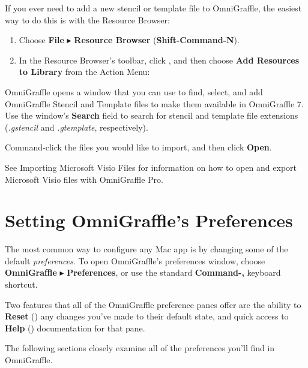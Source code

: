 \documentclass[../main.tex]{subfiles}
\begin{document}
If you ever need to add a new stencil or template file to OmniGraffle, the easiest way to do
this is with the Resource Browser:

\begin{enumerate}
  \item Choose \textbf{File} $\blacktriangleright$ \textbf{Resource Browser}
    (\textbf{Shift-Command-N}).
  \item In the Resource Browser's toolbar, click
    , and then choose \textbf{Add Resources to
    Library} from the Action Menu:
\end{enumerate}


OmniGraffle opens a window that you can use to find, select, and add OmniGraffle Stencil and
Template files to make them available in OmniGraffle 7. Use the window's \textbf{Search} field
to search for stencil and template file extensions (\textit{.gstencil} and
\textit{.gtemplate}, respectively).


Command-click the files you would like to import, and then click \textbf{Open}.

\begin{ognote}
  See Importing Microsoft Visio Files for information on how to open and export Microsoft Visio
  files with OmniGraffle Pro.
\end{ognote}

\section{Setting OmniGraffle's Preferences}

The most common way to configure any Mac app is by changing some of the default
\textit{preferences}. To open OmniGraffle's preferences window, choose \textbf{OmniGraffle}
$\blacktriangleright$ \textbf{Preferences}, or use the standard \textbf{Command-,} keyboard
shortcut.

Two features that all of the OmniGraffle preference panes offer are the ability to
\textbf{Reset} () any changes you've made to their
default state, and quick access to \textbf{Help} ()
documentation for that pane.

The following sections closely examine all of the preferences you'll find in OmniGraffle.
\end{document}
